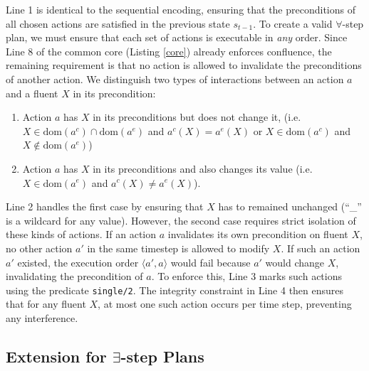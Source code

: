 \documentclass[
     11pt,                    %
     a4paper,             %
     BCOR=10mm,     %
     DIV=14,                 %
     listof=totoc,                    %
     bibliography=totoc,       %
     index=totoc,              %
     parskip            %
     twoside,
     headsepline
     ]{scrreprt}
\theoremstyle{definition}
\theoremstyle{definition}
\theoremstyle{remark}
\theoremstyle{bfnote}
\newcommand{\dom}{\mathrm{dom}}
\begin{document}
Line 1 is identical to the sequential encoding, ensuring that the preconditions of all chosen actions are satisfied in the previous state $s_{t-1}$.
To create a valid $\forall$-step plan, we must ensure that each set of actions is executable in \textit{any} order. 
Since Line 8 of the common core (Listing \ref{core}) already enforces confluence, the remaining requirement is that no action is allowed to invalidate the preconditions of another action.
We distinguish two types of interactions between an action $a$ and a fluent $X$ in its precondition:
\begin{enumerate}
  \item Action $a$ has $X$ in its preconditions but does not change it, (i.e. $X \in \dom(a^c) \cap \dom(a^e)$ and $a^c(X) = a^e(X)$ or $X \in \dom(a^c)$ and $X \notin \dom(a^e)$)
  \item Action $a$ has $X$ in its preconditions and also changes its value (i.e. $X \in \dom(a^e)$ and $a^c(X) \ne a^e(X)$).
\end{enumerate}
Line 2 handles the first case by ensuring that $X$ has to remained unchanged (\enquote{\_} is a wildcard for any value).
However, the second case requires strict isolation of these kinds of actions. 
If an action $a$ invalidates its own precondition on fluent $X$, no other action $a'$ in the same timestep is allowed to modify $X$. 
If such an action $a'$ existed, the execution order $\langle a', a \rangle$ would fail because $a'$ would change $X$, invalidating the precondition of $a$.
To enforce this, Line 3 marks such actions using the predicate \texttt{single/2}. 
The integrity constraint in Line 4 then ensures that for any fluent $X$, at most one such action occurs per time step, preventing any interference.

\subsection{Extension for \texorpdfstring{$\boldsymbol{\exists}$}{exists}-step Plans}

\begin{listing}[t]
  \caption{Extension of Listing \ref{core} for Encoding $\exists$-step Plans}
  \inputminted[frame=single,framesep=2mm,baselinestretch=1.2,linenos, firstline=2, firstnumber=1]{prolog}{encodings/EX_exists.lp}
  \label{exists}
\end{listing}
\begin{listing}[t]
  \caption{Alternative Extension for $\exists$-step Plans}
  \inputminted[frame=single,framesep=2mm,baselinestretch=1.2,linenos, firstline=2, firstnumber=1]{prolog}{encodings/EX_exists_alt.lp}
  \label{exists_alt}
\end{listing}
\end{document}
